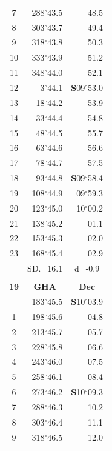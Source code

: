 \documentclass[10pt, a4paper]{report}
\begin{document}
\begin{scriptsize}
\begin{tabular*}{0.2\textwidth}[t]{@{\extracolsep{\fill}}|c|rr|}
7 & 288$^\circ$43.5 & 48.5\\
8 & 303$^\circ$43.7 & 49.4\\
9 & 318$^\circ$43.8 & \raisebox{0.24ex}{\boldmath$\cdot$~\boldmath$\cdot$~~}50.3\\
10 & 333$^\circ$43.9 & 51.2\\
11 & 348$^\circ$44.0 & 52.1\\[2Pt]
12 & 3$^\circ$44.1 & \textbf{S}09$^\circ$53.0\\
13 & 18$^\circ$44.2 & 53.9\\
14 & 33$^\circ$44.4 & 54.8\\
15 & 48$^\circ$44.5 & \raisebox{0.24ex}{\boldmath$\cdot$~\boldmath$\cdot$~~}55.7\\
16 & 63$^\circ$44.6 & 56.6\\
17 & 78$^\circ$44.7 & 57.5\\[2Pt]
18 & 93$^\circ$44.8 & \textbf{S}09$^\circ$58.4\\
19 & 108$^\circ$44.9 & 09$^\circ$59.3\\
20 & 123$^\circ$45.0 & 10$^\circ$00.2\\
21 & 138$^\circ$45.2 & \raisebox{0.24ex}{\boldmath$\cdot$~\boldmath$\cdot$~~}01.1\\
22 & 153$^\circ$45.3 & 02.0\\
23 & 168$^\circ$45.4 & 02.9\\
\hline
\rule{0pt}{2.4ex} & \multicolumn{1}{c}{SD.=16.1} & \multicolumn{1}{c|}{d=-0.9}\\
\hline
\multicolumn{1}{c}{}\\[-0.5ex]\hline
\multicolumn{1}{|c|}{\rule{0pt}{2.6ex}\textbf{19}} & \multicolumn{1}{c}{\textbf{GHA}} & \multicolumn{1}{c|}{\textbf{Dec}}\\
\hline\rule{0pt}{2.6ex}\noindent
0 & 183$^\circ$45.5 & \textbf{S}10$^\circ$03.9\\
1 & 198$^\circ$45.6 & 04.8\\
2 & 213$^\circ$45.7 & 05.7\\
3 & 228$^\circ$45.8 & \raisebox{0.24ex}{\boldmath$\cdot$~\boldmath$\cdot$~~}06.6\\
4 & 243$^\circ$46.0 & 07.5\\
5 & 258$^\circ$46.1 & 08.4\\[2Pt]
6 & 273$^\circ$46.2 & \textbf{S}10$^\circ$09.3\\
7 & 288$^\circ$46.3 & 10.2\\
8 & 303$^\circ$46.4 & 11.1\\
9 & 318$^\circ$46.5 & \raisebox{0.24ex}{\boldmath$\cdot$~\boldmath$\cdot$~~}12.0\\

\end{tabular*}
\end{scriptsize}
\end{document}
